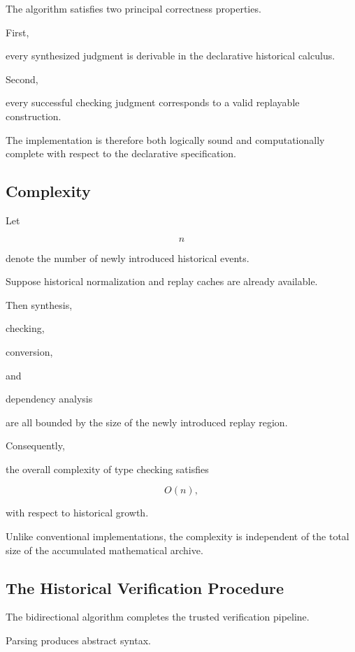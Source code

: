 \documentclass[12pt,oneside]{article}
\theoremstyle{definition}
\theoremstyle{remark}
\begin{document}
The algorithm satisfies two principal correctness properties.

First,

every synthesized judgment is derivable in the declarative historical calculus.

Second,

every successful checking judgment corresponds to a valid replayable
construction.

The implementation is therefore both logically sound and computationally
complete with respect to the declarative specification.


\subsection{Complexity}

Let

\[
n
\]

denote the number of newly introduced historical events.

Suppose historical normalization and replay caches are already available.

Then synthesis,

checking,

conversion,

and

dependency analysis

are all bounded by the size of the newly introduced replay region.

Consequently,

the overall complexity of type checking satisfies

\[
O(n),
\]

with respect to historical growth.

Unlike conventional implementations, the complexity is independent of the total
size of the accumulated mathematical archive.


\subsection{The Historical Verification Procedure}

The bidirectional algorithm completes the trusted verification pipeline.

Parsing produces abstract syntax.
\end{document}
